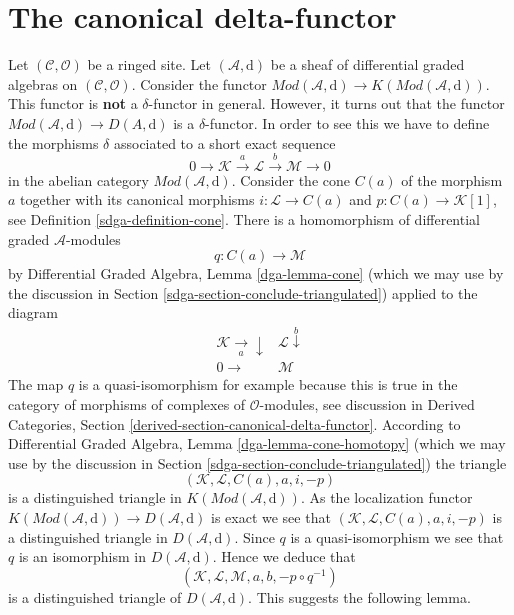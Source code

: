 \section{The canonical delta-functor}
\label{sdga-section-canonical-delta-functor}
Let $(\mathcal{C}, \mathcal{O})$ be a ringed site. Let
$(\mathcal{A}, \text{d})$ be a sheaf of differential graded algebras
on $(\mathcal{C}, \mathcal{O})$.
Consider the functor
$\textit{Mod}(\mathcal{A}, \text{d}) \to
K(\textit{Mod}(\mathcal{A}, \text{d}))$.
This functor is {\bf not} a $\delta$-functor in general.
However, it turns out that the functor
$\textit{Mod}(\mathcal{A}, \text{d}) \to D(A, \text{d})$ is a
$\delta$-functor. In order to see this we have to define
the morphisms $\delta$ associated to a short exact sequence
$$
0 \to \mathcal{K} \xrightarrow{a} \mathcal{L} \xrightarrow{b} \mathcal{M} \to 0
$$
in the abelian category $\textit{Mod}(\mathcal{A}, \text{d})$.
Consider the cone $C(a)$ of the morphism $a$ together with its
canonical morphisms $i : \mathcal{L} \to C(a)$ and
$p : C(a) \to \mathcal{K}[1]$, see Definition \ref{sdga-definition-cone}.
There is a homomorphism of differential graded $\mathcal{A}$-modules
$$
q : C(a) \longrightarrow \mathcal{M}
$$
by Differential Graded Algebra, Lemma \ref{dga-lemma-cone}
(which we may use by the discussion in
Section \ref{sdga-section-conclude-triangulated})
applied to the diagram
$$
\begin{array}{cc}\mathcal{K} \underset{a}{\longrightarrow}\downarrow & \mathcal{L} \overset{b}{\downarrow} \\ 0 \longrightarrow & \mathcal{M}\end{array}
$$
The map $q$ is a quasi-isomorphism for example because this is true in
the category of morphisms of complexes of $\mathcal{O}$-modules, see
discussion in
Derived Categories, Section \ref{derived-section-canonical-delta-functor}.
According to Differential Graded Algebra, Lemma \ref{dga-lemma-cone-homotopy}
(which we may use by the discussion in
Section \ref{sdga-section-conclude-triangulated})
the triangle
$$
(\mathcal{K}, \mathcal{L}, C(a), a, i, -p)
$$
is a distinguished triangle in $K(\textit{Mod}(\mathcal{A}, \text{d}))$.
As the localization functor
$K(\textit{Mod}(\mathcal{A}, \text{d})) \to D(\mathcal{A}, \text{d})$ is
exact we see that $(\mathcal{K}, \mathcal{L}, C(a), a, i, -p)$
is a distinguished
triangle in $D(\mathcal{A}, \text{d})$. Since $q$ is a quasi-isomorphism
we see that $q$ is an isomorphism in $D(\mathcal{A}, \text{d})$.
Hence we deduce that
$$
(\mathcal{K}, \mathcal{L}, \mathcal{M}, a, b, -p \circ q^{-1})
$$
is a distinguished triangle of $D(\mathcal{A}, \text{d})$.
This suggests the following lemma.

